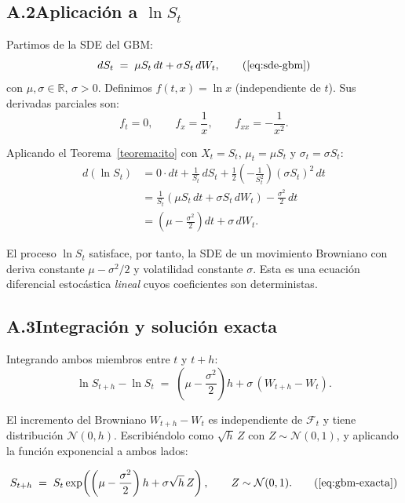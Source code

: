 \subsection*{A.2\quad Aplicación a $\ln S_t$}

Partimos de la SDE del GBM:
\[
    dS_t \;=\; \mu S_t\,dt + \sigma S_t\,dW_t,
    \tag{\ref{eq:sde-gbm}}
\]
con $\mu, \sigma \in \mathbb{R}$, $\sigma > 0$. Definimos $f(t, x) = \ln x$ (independiente de $t$). Sus derivadas parciales son:
\[
    f_t = 0, \qquad f_x = \frac{1}{x}, \qquad f_{xx} = -\frac{1}{x^2}.
\]

Aplicando el Teorema~\ref{teorema:ito} con $X_t = S_t$, $\mu_t = \mu S_t$ y $\sigma_t = \sigma S_t$:
\begin{align*}
    d(\ln S_t)
    &= 0 \cdot dt + \frac{1}{S_t}\,dS_t + \frac{1}{2}\left(-\frac{1}{S_t^2}\right)(\sigma S_t)^2\,dt \\[4pt]
    &= \frac{1}{S_t}(\mu S_t\,dt + \sigma S_t\,dW_t) - \frac{\sigma^2}{2}\,dt \\[4pt]
    &= \left(\mu - \frac{\sigma^2}{2}\right)dt + \sigma\,dW_t.
\end{align*}

El proceso $\ln S_t$ satisface, por tanto, la SDE de un movimiento Browniano con deriva constante $\mu - \sigma^2/2$ y volatilidad constante $\sigma$. Esta es una ecuación diferencial estocástica \emph{lineal} cuyos coeficientes son deterministas.

\subsection*{A.3\quad Integración y solución exacta}

Integrando ambos miembros entre $t$ y $t + h$:
\[
    \ln S_{t+h} - \ln S_t
    \;=\; \left(\mu - \frac{\sigma^2}{2}\right)h + \sigma\,(W_{t+h} - W_t).
\]

El incremento del Browniano $W_{t+h} - W_t$ es independiente de $\mathcal{F}_t$ y tiene distribución $\mathcal{N}(0, h)$. Escribiéndolo como $\sqrt{h}\,Z$ con $Z \sim \mathcal{N}(0,1)$, y aplicando la función exponencial a ambos lados:

\begin{equation}
    S_{t+h} \;=\; S_t \exp\!\left(\left(\mu - \frac{\sigma^2}{2}\right)h + \sigma\sqrt{h}\,Z\right),
    \qquad Z \sim \mathcal{N}(0,1).
    \tag{\ref{eq:gbm-exacta}}
\end{equation}

